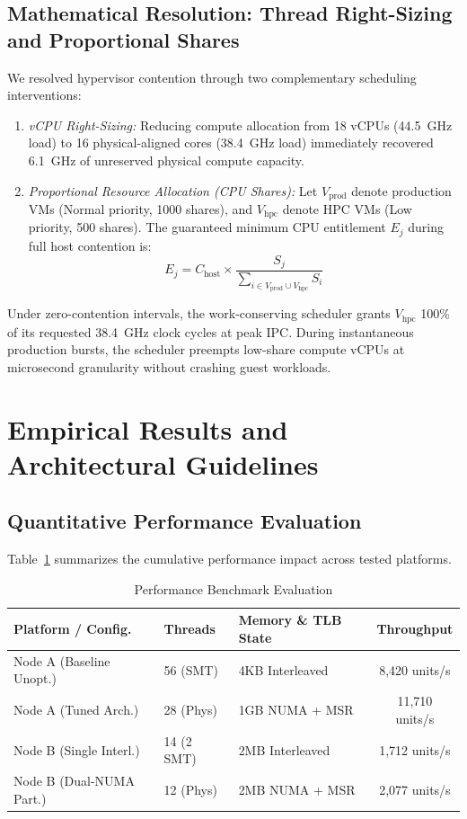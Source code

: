 \documentclass[journal]{IEEEtran}
\begin{document}
\subsection{Mathematical Resolution: Thread Right-Sizing and Proportional Shares}
We resolved hypervisor contention through two complementary scheduling interventions:
\begin{enumerate}
\item \textit{vCPU Right-Sizing:} Reducing compute allocation from 18 vCPUs (44.5~GHz load) to 16 physical-aligned cores (38.4~GHz load) immediately recovered 6.1~GHz of unreserved physical compute capacity.
\item \textit{Proportional Resource Allocation (CPU Shares):} Let $V_{\text{prod}}$ denote production VMs (Normal priority, 1000 shares), and $V_{\text{hpc}}$ denote HPC VMs (Low priority, 500 shares). The guaranteed minimum CPU entitlement $E_j$ during full host contention is:
\begin{equation}
E_j = C_{\text{host}} \times \frac{S_j}{\sum_{i \in V_{\text{prod}} \cup V_{\text{hpc}}} S_i}
\end{equation}
\end{enumerate}

Under zero-contention intervals, the work-conserving scheduler grants $V_{\text{hpc}}$ 100\% of its requested 38.4~GHz clock cycles at peak IPC. During instantaneous production bursts, the scheduler preempts low-share compute vCPUs at microsecond granularity without crashing guest workloads.

\section{Empirical Results and Architectural Guidelines}

\subsection{Quantitative Performance Evaluation}
Table~\ref{tab:results} summarizes the cumulative performance impact across tested platforms.

\begin{table}[h]
\caption{Performance Benchmark Evaluation}
\label{tab:results}
\centering
\begin{tabular}{lllc}
\toprule
\textbf{Platform / Config.} & \textbf{Threads} & \textbf{Memory \& TLB State} & \textbf{Throughput} \\
\midrule
Node A (Baseline Unopt.) & 56 (SMT) & 4KB Interleaved & 8,420 units/s \\
Node A (Tuned Arch.) & 28 (Phys) & 1GB NUMA + MSR & 11,710 units/s \\
Node B (Single Interl.) & 14 (2 SMT) & 2MB Interleaved & 1,712 units/s \\
Node B (Dual-NUMA Part.) & 12 (Phys) & 2MB NUMA + MSR & 2,077 units/s \\
\bottomrule
\end{tabular}
\end{table}
\end{document}
